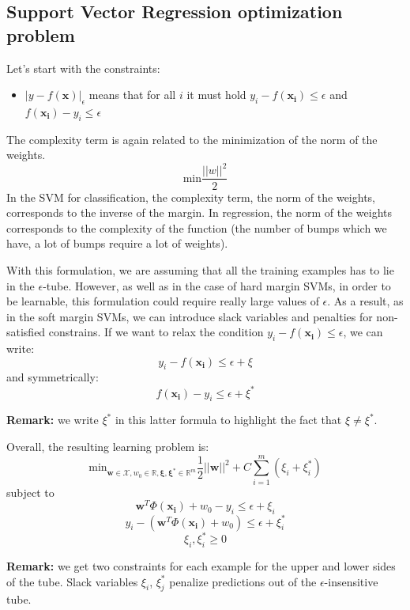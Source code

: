 \subsection{Support Vector Regression optimization problem}
Let's start with the constraints:
\begin{itemize}
	\item $|y-f(\pmb{x})|_{\epsilon}$ means that for all $i$ it must hold $y_{i}- f
		(\pmb{x_i}) \leq \epsilon$ and $f(\pmb{x_i}) - y_{i}\leq \epsilon$
\end{itemize}

The complexity term is again related to the minimization of the norm of the
weights.
\[
	\text{min}\frac{||w||^{2}}{2}
\]
In the SVM for classification, the complexity term, the norm of the weights,
corresponds to the inverse of the margin. In regression, the norm of the weights
corresponds to the complexity of the function (the number of bumps which we have,
a lot of bumps require a lot of weights).
\newline

With this formulation, we are assuming that all the training examples has to lie
in the $\epsilon$-tube. However, as well as in the case of hard margin SVMs, in order
to be learnable, this formulation could require really large values of
$\epsilon$. As a result, as in the soft margin SVMs, we can introduce slack variables
and penalties for non-satisfied constrains. If we want to relax the condition
$y_{i}- f(\pmb{x_i}) \leq \epsilon$, we can write:
\[
	y_{i}- f(\pmb{x_i}) \leq \epsilon + \xi
\]
and symmetrically:
\[
	f(\pmb{x_i}) - y_{i}\leq \epsilon + \xi^{*}
\]

\textbf{Remark:} we write $\xi^{*}$ in this latter formula to highlight the fact
that $\xi \neq \xi^{*}$.
\newline

Overall, the resulting learning problem is:
\begin{equation}
	\text{min}_{\pmb{w} \in \mathcal{X}, w_0 \in \mathbb{R}, \pmb{\xi}, \pmb{\xi^*}
	\in \mathbb{R}^m}\frac{1}{2}||\pmb{w}||^{2}+ C \sum_{i=1}^{m}(\xi_{i}+ \xi_{i}^{*}
	)
\end{equation}
subject to
\[
	\pmb{w}^{T}\Phi(\pmb{x_i}) + w_{0}- y_{i}\leq \epsilon + \xi_{i}
\]
\[
	y_{i}- (\pmb{w}^{T}\Phi(\pmb{x_i})+w_{0}) \leq \epsilon + \xi_{i}^{*}
\]
\[
	\xi_{i}, \xi_{i}^{*}\geq 0
\]

\textbf{Remark:} we get two constraints for each example for the upper and lower
sides of the tube. Slack variables $\xi_{i}$, $\xi_{j}^{*}$ penalize predictions
out of the $\epsilon$-insensitive tube.
\newline

